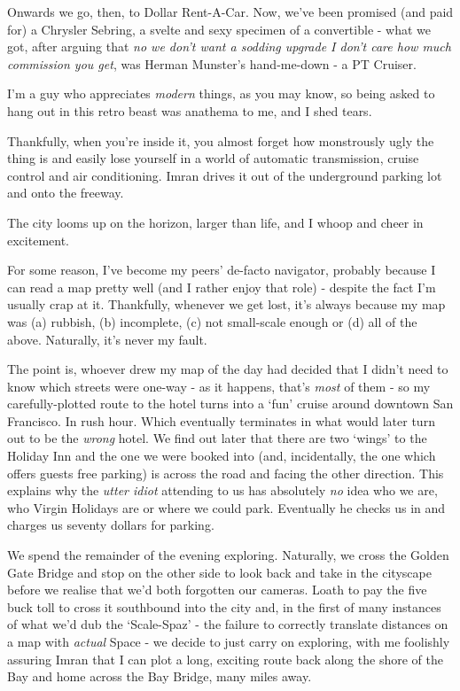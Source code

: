 \documentclass[a5paper,titlepage,11pt,draft]{book}
\begin{document}
Onwards we go, then, to Dollar Rent-A-Car.  Now, we've been promised (and paid for) a Chrysler Sebring, a svelte and sexy specimen of a convertible - what we got, after arguing that \emph{no we don't want a sodding upgrade I don't care how much commission you get}, was Herman Munster's hand-me-down - a PT Cruiser.

I'm a guy who appreciates \emph{modern} things, as you may know, so being asked to hang out in this retro beast was anathema to me, and I shed tears.

Thankfully, when you're inside it, you almost forget how monstrously ugly the thing is and easily lose yourself in a world of automatic transmission, cruise control and air conditioning.  Imran drives it out of the underground parking lot and onto the freeway.

The city looms up on the horizon, larger than life, and I whoop and cheer in excitement.

For some reason, I've become my peers' de-facto navigator, probably because I can read a map pretty well (and I rather enjoy that role) - despite the fact I'm usually crap at it.  Thankfully, whenever we get lost, it's always because my map was (a) rubbish, (b) incomplete, (c) not small-scale enough or (d) all of the above.  Naturally, it's never my fault.

The point is, whoever drew my map of the day had decided that I didn't need to know which streets were one-way - as it happens, that's \emph{most} of them - so my carefully-plotted route to the hotel turns into a `fun' cruise around downtown San Francisco.  In rush hour.  Which eventually terminates in what would later turn out to be the \emph{wrong} hotel.  We find out later that there are two `wings' to the Holiday Inn and the one we were booked into (and, incidentally, the one which offers guests free parking) is across the road and facing the other direction.  This explains why the \emph{utter idiot} attending to us has absolutely \emph{no} idea who we are, who Virgin Holidays are or where we could park.  Eventually he checks us in and charges us seventy dollars for parking.  

We spend the remainder of the evening exploring.  Naturally, we cross the Golden Gate Bridge and stop on the other side to look back and take in the cityscape before we realise that we'd both forgotten our cameras.  Loath to pay the five buck toll to cross it southbound into the city and, in the first of many instances of what we'd dub the `Scale-Spaz' - the failure to correctly translate distances on a map with \emph{actual} Space - we decide to just carry on exploring, with me foolishly assuring Imran that I can plot a long, exciting route back along the shore of the Bay and home across the Bay Bridge, many miles away.
\end{document}
